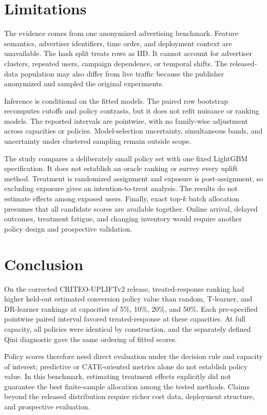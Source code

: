 \documentclass[11pt]{article}
\begin{document}
\section{Limitations}

The evidence comes from one anonymized advertising benchmark. Feature semantics, advertiser identifiers, time order, and deployment context are unavailable. The hash split treats rows as IID. It cannot account for advertiser clusters, repeated users, campaign dependence, or temporal shifts. The released-data population may also differ from live traffic because the publisher anonymized and sampled the original experiments.

Inference is conditional on the fitted models. The paired row bootstrap recomputes cutoffs and policy contrasts, but it does not refit nuisance or ranking models. The reported intervals are pointwise, with no family-wise adjustment across capacities or policies. Model-selection uncertainty, simultaneous bands, and uncertainty under clustered sampling remain outside scope.

The study compares a deliberately small policy set with one fixed LightGBM specification. It does not establish an oracle ranking or survey every uplift method. Treatment is randomized assignment and exposure is post-assignment, so excluding exposure gives an intention-to-treat analysis. The results do not estimate effects among exposed users. Finally, exact top-$k$ batch allocation presumes that all candidate scores are available together. Online arrival, delayed outcomes, treatment fatigue, and changing inventory would require another policy design and prospective validation.

\section{Conclusion}

On the corrected CRITEO-UPLIFTv2 release, treated-response ranking had higher held-out estimated conversion policy value than random, T-learner, and DR-learner rankings at capacities of 5\%, 10\%, 20\%, and 50\%. Each pre-specified pointwise paired interval favored treated-response at these capacities. At full capacity, all policies were identical by construction, and the separately defined Qini diagnostic gave the same ordering of fitted scores.

Policy scores therefore need direct evaluation under the decision rule and capacity of interest; predictive or CATE-oriented metrics alone do not establish policy value. In this benchmark, estimating treatment effects explicitly did not guarantee the best finite-sample allocation among the tested methods. Claims beyond the released distribution require richer cost data, deployment structure, and prospective evaluation.
\end{document}
